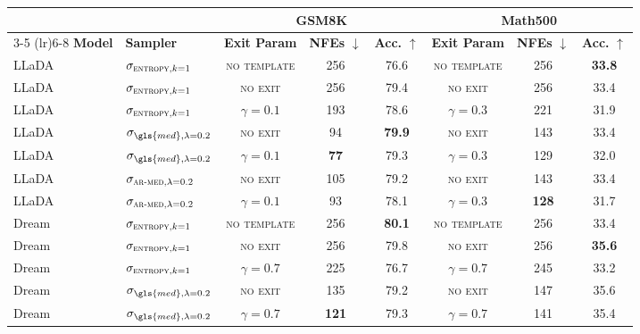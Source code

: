 \begin{table}[h]
    \centering
    \begin{tabular}{ll ccc ccc}
\toprule
\multicolumn{2}{c}{} & \multicolumn{3}{c}{\textbf{GSM8K}} & \multicolumn{3}{c}{\textbf{Math500}} \\
\cmidrule(lr){3-5} \cmidrule(lr){6-8}
\textbf{Model} & \textbf{Sampler} & \textbf{Exit Param} & \textbf{NFEs} $\downarrow$ & \textbf{Acc.} $\uparrow$ & \textbf{Exit Param} & \textbf{NFEs} $\downarrow$ & \textbf{Acc.} $\uparrow$ \\
\midrule
        LLaDA & $\sigma_{\textsc{entropy}, k=1}$ & \textsc{no template} & 256 & 76.6 & \textsc{no template} & 256 & \textbf{33.8} \\
        LLaDA & $\sigma_{\textsc{entropy}, k=1}$ & \textsc{no exit}     & 256 & 79.4 & \textsc{no exit}     & 256 & 33.4 \\
        LLaDA & $\sigma_{\textsc{entropy}, k=1}$ & $\gamma=0.1$         & 193 & 78.6 & $\gamma=0.3$         & 221 & 31.9 \\
        \midrule
        LLaDA & $\sigma_{\gls{med}, \lambda = 0.2}$ & \textsc{no exit}   & 94  & \textbf{79.9} & \textsc{no exit}   & 143 & 33.4 \\
        LLaDA & $\sigma_{\gls{med}, \lambda = 0.2}$ & $\gamma=0.1$       & \textbf{77}  & 79.3 & $\gamma=0.3$       & 129 & 32.0 \\
        \midrule
        LLaDA & $\sigma_{\textsc{ar-med}, \lambda = 0.2}$ & \textsc{no exit} & 105 & 79.2 & \textsc{no exit} & 143 & 33.4 \\
        LLaDA & $\sigma_{\textsc{ar-med}, \lambda = 0.2}$ & $\gamma=0.1$     & 93  & 78.1 & $\gamma=0.3$     & \textbf{128} & 31.7 \\
        \midrule\midrule
        Dream & $\sigma_{\textsc{entropy}, k=1}$ & \textsc{no template} & 256 & \textbf{80.1} & \textsc{no template} & 256 & 33.4 \\
        Dream & $\sigma_{\textsc{entropy}, k=1}$ & \textsc{no exit}     & 256 & 79.8 & \textsc{no exit}     & 256 & \textbf{35.6} \\
        Dream & $\sigma_{\textsc{entropy}, k=1}$ & $\gamma=0.7$         & 225 & 76.7 & $\gamma=0.7$         & 245 & 33.2 \\
        \midrule
        Dream & $\sigma_{\gls{med}, \lambda = 0.2}$ & \textsc{no exit}   & 135 & 79.2 & \textsc{no exit}   & 147 & 35.6 \\
        Dream & $\sigma_{\gls{med}, \lambda = 0.2}$ & $\gamma=0.7$       & \textbf{121} & 79.3 & $\gamma=0.7$       & 141 & 35.4 \\

\end{tabular}
\end{table}
